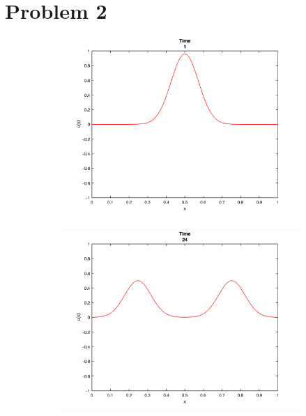 \documentclass[12pt]{article}
\begin{document}
\section*{Problem 2}

\begin{figure}[h!]
\centering

\begin{subfigure}{0.49\columnwidth}
\centering
\includegraphics[width=\textwidth]{problem_2_t_1.png}
\caption{}
\label{fig:time1}
\end{subfigure}\hfill
\begin{subfigure}{0.49\columnwidth}
\centering
\includegraphics[width=\textwidth]{problem_2_t_24.png}
\caption{}
\label{fig:time2}
\end{subfigure}


\end{figure}
\end{document}
